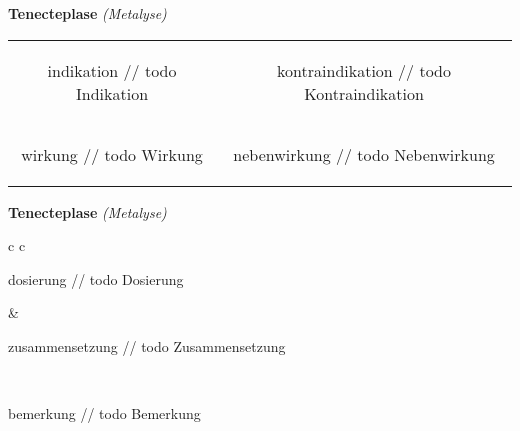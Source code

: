 \documentclass[12pt]{beamer}
\begin{document}
\begin{frame}{
    \textbf{Tenecteplase}
    \textit{(Metalyse)}
}
    \begin{tabular}{c c}
        \begin{beamercolorbox}[wd=\boxwidth\textwidth,ht=\boxheight\textheight,sep=1em]{indikation}
        // todo Indikation
        \end{beamercolorbox} & 
        \begin{beamercolorbox}[wd=\boxwidth\textwidth,ht=\boxheight\textheight,sep=1em]{kontraindikation}
        // todo Kontraindikation 
        \end{beamercolorbox} \\
        \begin{beamercolorbox}[wd=\boxwidth\textwidth,ht=\boxheight\textheight,sep=1em]{wirkung}
        // todo Wirkung
        \end{beamercolorbox} & 
        \begin{beamercolorbox}[wd=\boxwidth\textwidth,ht=\boxheight\textheight,sep=1em]{nebenwirkung}
        // todo Nebenwirkung
        \end{beamercolorbox} \\
    \end{tabular}
\end{frame}

\begin{frame}{
    \textbf{Tenecteplase}
    \textit{(Metalyse)}
}
    \begin{tabular}{c c}
        \begin{beamercolorbox}[wd=\boxwidth\textwidth,ht=\boxheight\textheight,sep=1em]{dosierung}
        // todo Dosierung
        \end{beamercolorbox} & 
        \begin{beamercolorbox}[wd=\boxwidth\textwidth,ht=\boxheight\textheight,sep=1em]{zusammensetzung}
        // todo Zusammensetzung
        \end{beamercolorbox} \\
        \begin{beamercolorbox}[wd=\textwidth,ht=\boxheight\textheight,sep=1em]{bemerkung}
        // todo Bemerkung
        \end{beamercolorbox} \\
    \end{tabular}
\end{frame}
\end{document}
